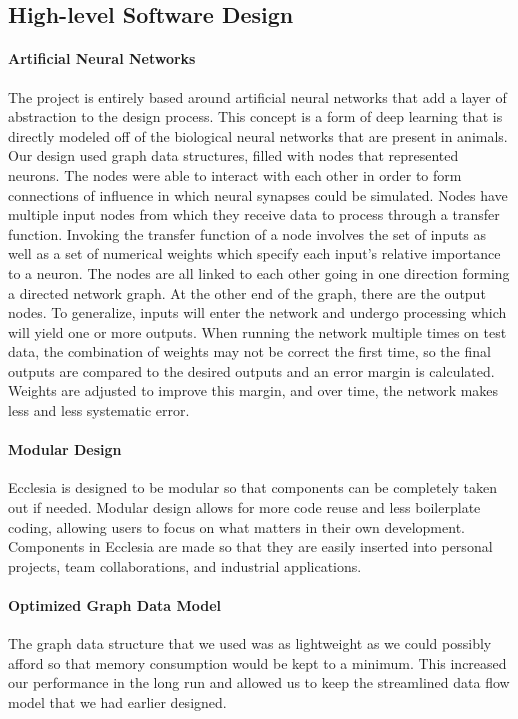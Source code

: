 \documentclass[letterpaper, 10pt]{article}
\begin{document}
	\subsection{High-level Software Design}
		\paragraph{Artificial Neural Networks}
		The project is entirely based around artificial neural networks that add a layer of abstraction to the design process. This concept is a form of deep learning that is directly modeled off of the biological neural networks that are present in animals. Our design used graph data structures, filled with nodes that represented neurons. The nodes were able to interact with each other in order to form connections of influence in which neural synapses could be simulated. Nodes have multiple input nodes from which they receive data to process through a transfer function. Invoking the transfer function of a node involves the set of inputs as well as a set of numerical weights which specify each input's relative importance to a neuron. The nodes are all linked to each other going in one direction forming a directed network graph. At the other end of the graph, there are the output nodes. To generalize, inputs will enter the network and undergo processing which will yield one or more outputs. When running the network multiple times on test data, the combination of weights may not be correct the first time, so the final outputs are compared to the desired outputs and an error margin is calculated. Weights are adjusted to improve this margin, and over time, the network makes less and less systematic error.
		\paragraph{Modular Design}
		Ecclesia is designed to be modular so that components can be completely taken out if needed. Modular design allows for more code reuse and less boilerplate coding, allowing users to focus on what matters in their own development. Components in Ecclesia are made so that they are easily inserted into personal projects, team collaborations, and industrial applications.
		\paragraph{Optimized Graph Data Model}
		The graph data structure that we used was as lightweight as we could possibly afford so that memory consumption would be kept to a minimum. This increased our performance in the long run and allowed us to keep the streamlined data flow model that we had earlier designed.
\end{document}
